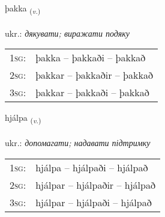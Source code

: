 \documentclass[frontgrid, backgrid]{flacards}\usepackage[]{graphicx}\usepackage[]{xcolor}
\begin{document}
{þakka \small{\textsubscript{(\textit{v.})}} \\[1ex] %
\textphonetic{[θahka]} \\
ukr.: \emph{дякувати; виражати подяку} \\  [2ex]
\renewcommand*{\arraystretch}{0.8}
\begin{tabular}{p{1cm}l}
\textsc{1sg}: & þakka -- þakkaði -- þakkað \\ 
\textsc{2sg}: & þakkar -- þakkaðir -- þakkað \\ 
\textsc{3sg}: & þakkar -- þakkaði -- þakkað \\ 
\end{tabular}
}

\renewcommand{\flhead}{\vskip5pt \fboxsep=0pt {\small\bfseries\footnotesize Sagnorð | дієслово}}
\renewcommand{\fcfoot}{\vskip5pt \fboxsep=0pt \hspace{2pt}{\small\bfseries\footnotesize 1K}}

\renewcommand{\blhead}{\vskip5pt {\small\bfseries\footnotesize Sagnorð | дієслово }}
\renewcommand{\bcfoot}{\vskip5pt \hspace{2pt}{\small\bfseries\footnotesize 1K}}


{hjálpa \small{\textsubscript{(\textit{v.})}} \\[1ex] %
\textphonetic{[çaul̥pa]} \\
ukr.: \emph{допомагати; надавати підтримку} \\  [2ex]
\renewcommand*{\arraystretch}{0.8}
\begin{tabular}{p{1cm}l}
\textsc{1sg}: & hjálpa -- hjálpaði -- hjálpað \\ 
\textsc{2sg}: & hjálpar -- hjálpaðir -- hjálpað \\ 
\textsc{3sg}: & hjálpar -- hjálpaði -- hjálpað \\ 
\end{tabular}
}

\renewcommand{\flhead}{\vskip5pt \fboxsep=0pt {\small\bfseries\footnotesize Nafnorð | іменник}}
\renewcommand{\fcfoot}{\vskip5pt \fboxsep=0pt \hspace{2pt}{\small\bfseries\footnotesize 1K}}
\end{document}
